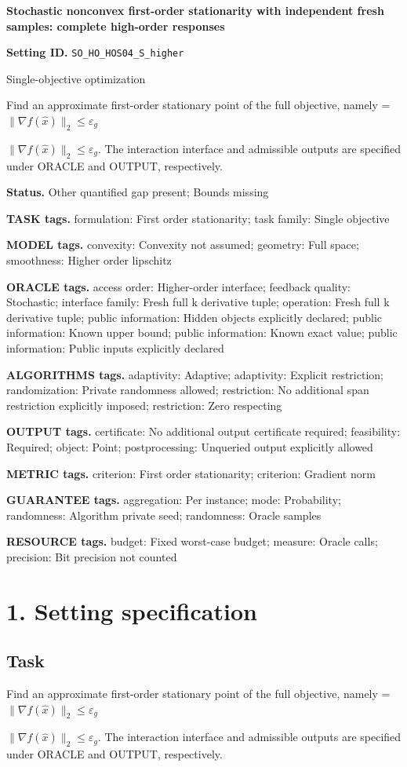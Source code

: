 \documentclass[10pt,a4paper]{article}
\newcommand{\AtlasMath}[1]{\par\begingroup\centering\setbox0=\hbox{$\displaystyle #1$}\ifdim\wd0>1.4\linewidth\typeout{ATLAS WIDE FORMULA: \the\wd0}\fi\ifdim\wd0>\linewidth\resizebox{\linewidth}{!}{\box0}\else\box0\fi\par\endgroup}
\newcommand{\AtlasInlineMath}[1]{\begingroup\setbox0=\hbox{$#1$}\ifdim\wd0>.4\linewidth\endgroup\AtlasMath{#1}\else\endgroup$#1$\fi}
\begin{document}
\raggedright

{\LARGE\bfseries\sffamily\color{AtlasNavy} Stochastic nonconvex first-order stationarity with independent fresh samples: complete high-order responses\par}\vspace{5pt}
\textbf{Setting ID.} \texttt{SO\_\allowbreak{}HO\_\allowbreak{}HOS04\_\allowbreak{}S\_\allowbreak{}higher}

Single-objective optimization

Find an approximate first-order stationary point of the full objective, namely \AtlasInlineMath{\|\nabla f(\widehat{x})\|_2\le\varepsilon_g}. The interaction interface and admissible outputs are specified under ORACLE and OUTPUT, respectively.

\textbf{Status.} Other quantified gap present; Bounds missing

\textbf{TASK tags.} formulation: First order stationarity; task family: Single objective

\textbf{MODEL tags.} convexity: Convexity not assumed; geometry: Full space; smoothness: Higher order lipschitz

\textbf{ORACLE tags.} access order: Higher-order interface; feedback quality: Stochastic; interface family: Fresh full k derivative tuple; operation: Fresh full k derivative tuple; public information: Hidden objects explicitly declared; public information: Known upper bound; public information: Known exact value; public information: Public inputs explicitly declared

\textbf{ALGORITHMS tags.} adaptivity: Adaptive; adaptivity: Explicit restriction; randomization: Private randomness allowed; restriction: No additional span restriction explicitly imposed; restriction: Zero respecting

\textbf{OUTPUT tags.} certificate: No additional output certificate required; feasibility: Required; object: Point; postprocessing: Unqueried output explicitly allowed

\textbf{METRIC tags.} criterion: First order stationarity; criterion: Gradient norm

\textbf{GUARANTEE tags.} aggregation: Per instance; mode: Probability; randomness: Algorithm private seed; randomness: Oracle samples

\textbf{RESOURCE tags.} budget: Fixed worst-case budget; measure: Oracle calls; precision: Bit precision not counted

\section{1. Setting specification}
\subsection{Task}
Find an approximate first-order stationary point of the full objective, namely \AtlasInlineMath{\|\nabla f(\widehat{x})\|_2\le\varepsilon_g}. The interaction interface and admissible outputs are specified under ORACLE and OUTPUT, respectively.
\end{document}
